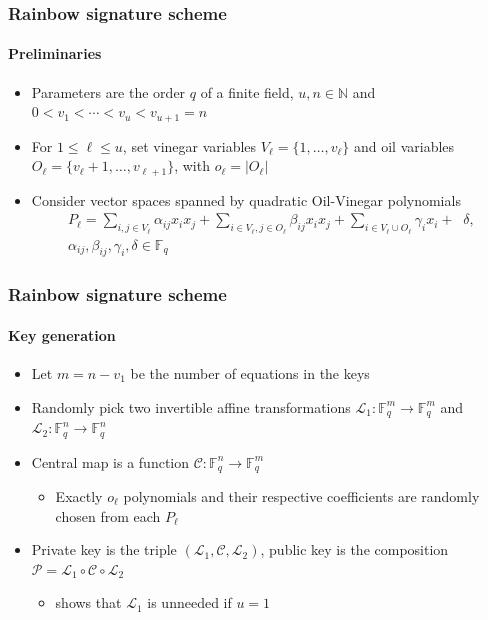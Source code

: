 \documentclass[12pt]{beamer}
\begin{document}
\begin{frame}
  \frametitle{Rainbow signature scheme}
  \framesubtitle{Preliminaries}
  \begin{itemize}
    \item Parameters are the order $q$ of a finite field, $u, n \in \mathbb{N}$
        and $0 < v_{1} < \cdots < v_{u} < v_{u + 1} = n$
    \item For $1 \leq \ell \leq u$, set vinegar variables
        $V_{\ell} = \{1, \dots, v_{\ell}\}$ and oil variables
        $O_{\ell} = \{v_{\ell} + 1, \dots, v_{\ell + 1}\}$, with
        $o_{\ell} = |O_{\ell}|$
    \item Consider vector spaces spanned by quadratic Oil-Vinegar polynomials
    \begin{align*}
      P_{\ell} = \sum_{i, j \in V_{\ell}} \alpha_{ij}  x_{i}  x_{j}
        + \sum_{i \in V_{\ell}, j \in O_{\ell}} \beta_{ij}  x_{i}  x_{j}
        + \sum_{i \in V_{\ell} \cup O_{\ell}} \gamma_{i}  x_{i} + \;\; \delta,
        \\ \alpha_{ij}, \beta_{ij}, \gamma_{i}, \delta \in \mathbb{F}_{q}
    \end{align*}
  \end{itemize}
\end{frame}

\begin{frame}
  \frametitle{Rainbow signature scheme}
  \framesubtitle{Key generation}
  \begin{itemize}
    \item Let $m = n - v_{1}$ be the number of equations in the keys
    \item Randomly pick two invertible affine transformations
        $\mathcal{L}_{1} : \mathbb{F}_{q}^{m} \to \mathbb{F}_{q}^{m}$ and
        $\mathcal{L}_{2} : \mathbb{F}_{q}^{n} \to \mathbb{F}_{q}^{n}$
    \item Central map is a function
        $\mathcal{C} : \mathbb{F}_{q}^{n} \to \mathbb{F}_{q}^{m}$
    \begin{itemize}
      \item Exactly $o_{\ell}$ polynomials and their respective coefficients
          are randomly chosen from each $P_{\ell}$
    \end{itemize}
    \item Private key is the triple
        $(\mathcal{L}_{1}, \mathcal{C}, \mathcal{L}_{2})$, public key is the
        composition
        $\mathcal{P} = \mathcal{L}_{1} \circ \mathcal{C} \circ \mathcal{L}_{2}$
     \begin{itemize}
       \item \cite{Wolf:200511} shows that $\mathcal{L}_{1}$ is unneeded if
           $u = 1$
     \end{itemize}
  \end{itemize}
\end{frame}
\end{document}
